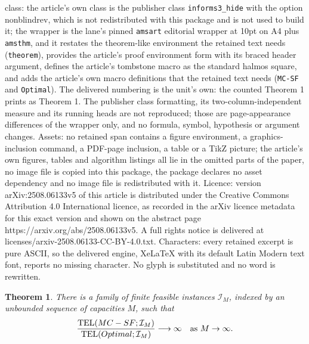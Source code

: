 \documentclass[10pt,a4paper]{amsart}
\newtheorem{theorem}{Theorem}
\newcommand{\mcsdf}{\texttt{MC-SF}}
\newcommand{\opt}{\texttt{Optimal}}
\begin{document}
class: the article's own class is the publisher class \texttt{informs3\_hide} with the option nonblindrev, which is not redistributed with this package and is not used to build it; the wrapper is the lane's pinned \texttt{amsart} editorial wrapper at 10pt on A4 plus \texttt{amsthm}, and it restates the theorem-like environment the retained text needs (\texttt{theorem}), provides the article's proof environment form with its braced header argument, defines the article's tombstone macro as the standard halmos square, and adds the article's own macro definitions that the retained text needs (\mcsdf{} and \opt{}). The delivered numbering is the unit's own: the counted Theorem 1 prints as Theorem 1. The publisher class formatting, its two-column-independent measure and its running heads are not reproduced; those are page-appearance differences of the wrapper only, and no formula, symbol, hypothesis or argument changes. Assets: no retained span contains a figure environment, a graphics-inclusion command, a PDF-page inclusion, a table or a TikZ picture; the article's own figures, tables and algorithm listings all lie in the omitted parts of the paper, no image file is copied into this package, the package declares no asset dependency and no image file is redistributed with it. Licence: version arXiv:2508.06133v5 of this article is distributed under the Creative Commons Attribution 4.0 International licence, as recorded in the arXiv licence metadata for this exact version and shown on the abstract page https://arxiv.org/abs/2508.06133v5. A full rights notice is delivered at licenses/arxiv-2508.06133-CC-BY-4.0.txt. Characters: every retained excerpt is pure ASCII, so the delivered engine, XeLaTeX with its default Latin Modern text font, reports no missing character. No glyph is substituted and no word is rewritten.
\begin{theorem} \label{thm:benchmark}
There is a family of finite feasible instances $\mathcal I_M$, indexed by an unbounded sequence of capacities $M$, such that
\[
\frac{\mathrm{TEL}(\textup{\mcsdf};\mathcal I_M)}
     {\mathrm{TEL}(\textup{\opt};\mathcal I_M)}\longrightarrow\infty
\quad\text{as }M\to\infty.
\]
\end{theorem}
\end{document}
